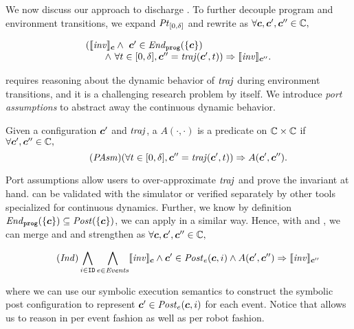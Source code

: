 We now discuss our approach to discharge .
To further decouple program and environment transitions,
we expand $\mathit{Pt}_{[0,\delta]}$  and rewrite  as $\forall \mathit{\boldsymbol{c}}, \mathit{\boldsymbol{c}}', \mathit{\boldsymbol{c}}'' \in \mathbb{C},$
\begin{small}
\begin{equation}\label{po:ind-hyp-traj}
\begin{array}{l}
(\llbracket\mathit{inv}\rrbracket_{\mathit{\boldsymbol{c}}} \land\ \mathit{\boldsymbol{c}}' \in \mathit{End}_{\mathtt{prog}}(\left\{\mathit{\boldsymbol{c}}\right\})\\
\qquad  \land\ \forall t \in [0, \delta], \mathit{\boldsymbol{c}}'' = \mathit{traj}(\mathit{\boldsymbol{c}}', t)) \Rightarrow \llbracket\mathit{inv}\rrbracket_{\mathit{\boldsymbol{c}}''}.
\end{array}
\end{equation}
\end{small}%
 requires reasoning about the dynamic behavior of $\mathit{traj}$ during environment transitions, and it is a challenging research problem by itself. We introduce {\em port assumptions\/} to abstract away the continuous dynamic behavior.
%
%
%
\begin{definition}
Given a configuration $\mathit{\boldsymbol{c}}'$ and $\mathit{traj}$, a \emph{\portasum} $A(\cdot, \cdot)$ is a predicate on $\mathbb{C}\times \mathbb{C}$ if  $\forall \mathit{\boldsymbol{c}}', \mathit{\boldsymbol{c}}'' \in \mathbb{C},$
\begin{equation}\label{po:port-asm}\tag{\textit{PAsm}}
(\forall t \in [0,\delta], \gconfig'' = \traj(\gconfig', t)) \Rightarrow A(\gconfig', \gconfig'').
\end{equation}
\end{definition}
Port assumptions allow users to over-approximate $\mathit{traj}$ and prove the invariant at hand.
 can be validated with the \toolname simulator or verified separately by other tools specialized for continuous dynamics.
Further, we know by definition $\mathit{End}_{\mathtt{prog}}(\left\{\mathit{\boldsymbol{c}}\right\}) \subseteq \mathit{Post}(\left\{\mathit{\boldsymbol{c}}\right\})$,
we can apply  in a similar way.
Hence, with  and ,
we can merge  and  and strengthen as
$\forall \mathit{\boldsymbol{c}}, \mathit{\boldsymbol{c}}', \mathit{\boldsymbol{c}}'' \in \mathbb{C},$
\begin{small}
\begin{equation}\label{po:ind}\tag{\textit{Ind}}
\bigwedge_{i\in \UINS} \bigwedge_{\Ev \in \Event} \eec{\Inv}{\gconfig} \land \gconfig' \in \Post_\Ev(\gconfig, i)
\land A(\gconfig', \gconfig'')
\Rightarrow \eec{\Inv}{\gconfig''}
\end{equation}
\end{small}%
where we can use our \K symbolic execution semantics to construct the symbolic post configuration
to represent $\mathit{\boldsymbol{c}}' \in \mathit{Post}_e(\mathit{\boldsymbol{c}}, i)$ for each event.
Notice that  allows us to reason in per event fashion as well as per robot fashion.

